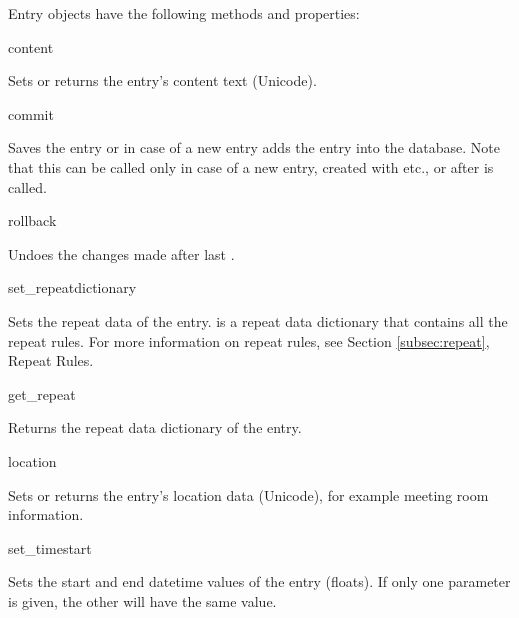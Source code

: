 \begin{classdesc*}{Entry}
 objects have the following methods and properties:

\begin{memberdesc}[Entry]{content}

Sets or returns the entry's content text (Unicode).

\end{memberdesc}

\begin{methoddesc}[Entry]{commit}{}

Saves the entry or in case of a new entry adds the entry into the database. 
Note that this can be called only in case of a new entry, created with 
 etc., or after  is called. 

\end{methoddesc}

\begin{methoddesc}[Entry]{rollback}{}

Undoes the changes made after last .

\end{methoddesc}

\begin{methoddesc}[Entry]{set_repeat}{dictionary}

Sets the repeat data of the entry.  is a repeat data dictionary 
that contains all the repeat rules. For more information on repeat rules, see 
Section \ref{subsec:repeat}, Repeat Rules.

\end{methoddesc}

\begin{methoddesc}[Entry]{get_repeat}{}

Returns the repeat data dictionary of the entry.

\end{methoddesc}

\begin{memberdesc}[Entry]{location}

Sets or returns the entry's location data (Unicode), for example meeting 
room information. 

\end{memberdesc}

\begin{methoddesc}[Entry]{set_time}{start}

Sets the start and end datetime values of the entry (floats). If only one 
parameter is given, the other will have the same value. 


\end{methoddesc}
\end{classdesc*}
